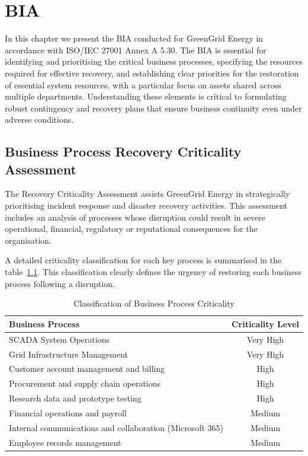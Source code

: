 \chapter{\ac{BIA}}

In this chapter we present the \ac{BIA} conducted for GreenGrid Energy in accordance with ISO/IEC 27001 Annex A 5.30. The \ac{BIA} is essential for identifying and prioritising the critical business processes, specifying the resources required for effective recovery, and establishing clear priorities for the restoration of essential system resources, with a particular focus on assets shared across multiple departments. Understanding these elements is critical to formulating robust contingency and recovery plans that ensure business continuity even under adverse conditions.

\section{Business Process Recovery Criticality Assessment}

The Recovery Criticality Assessment assists GreenGrid Energy in strategically prioritising incident response and disaster recovery activities. This assessment includes an analysis of processes whose disruption could result in severe operational, financial, regulatory or reputational consequences for the organisation.

A detailed criticality classification for each key process is summarised in the table~\ref{tab:process_criticality}. This classification clearly defines the urgency of restoring each business process following a disruption.

\begin{table}[H]
\centering
\begin{tabular}{|l|c|}
\hline
\textbf{Business Process} & \textbf{Criticality Level} \\ \hline
\ac{SCADA} System Operations & Very High \\ \hline
Grid Infrastructure Management & Very High \\ \hline
Customer account management and billing & High \\ \hline
Procurement and supply chain operations & High \\ \hline
Research data and prototype testing & High \\ \hline
Financial operations and payroll & Medium \\ \hline
Internal communications and collaboration (Microsoft 365) & Medium \\ \hline
Employee records management & Medium \\ \hline
\end{tabular}
\caption{Classification of Business Process Criticality}
\label{tab:process_criticality}
\end{table}

